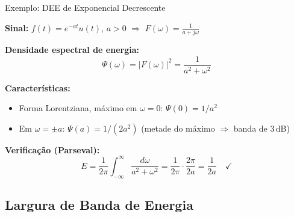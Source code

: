 
\begin{frame}{Exemplo: DEE de Exponencial Decrescente}

\textbf{Sinal:} $f(t) = e^{-at}u(t)$, $a > 0$ \quad $\Rightarrow$ \quad $F(\omega) = \frac{1}{a + j\omega}$

\textbf{Densidade espectral de energia:}
\vspace{-2mm}
\[
\Psi(\omega) = |F(\omega)|^2 = \frac{1}{a^2 + \omega^2}
\]
\vspace{-2mm}

\textbf{Características:}

\begin{itemize}
\item Forma Lorentziana, máximo em $\omega = 0$: $\Psi(0) = 1/a^2$
\item Em $\omega = \pm a$: $\Psi(a) = 1/(2a^2)$ (metade do máximo $\Rightarrow$ banda de 3\,dB)
\end{itemize}

\textbf{Verificação (Parseval):}
\vspace{-2mm}
\[
E = \frac{1}{2\pi} \int_{-\infty}^{\infty} \frac{d\omega}{a^2 + \omega^2} = \frac{1}{2\pi} \cdot \frac{2\pi}{2a} = \frac{1}{2a} \quad \checkmark
\]

\end{frame}


\subsection{Largura de Banda de Energia}


